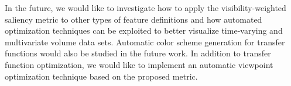 In the future, we would like to investigate how to apply the visibility-weighted saliency metric to other types of feature definitions and how automated optimization techniques can be exploited to better visualize time-varying and multivariate volume data sets. Automatic color scheme generation \cite{zhou_automatic_2009} for transfer functions would also be studied in the future work.
In addition to transfer function optimization, we would like to implement an automatic viewpoint optimization technique based on the proposed metric.

